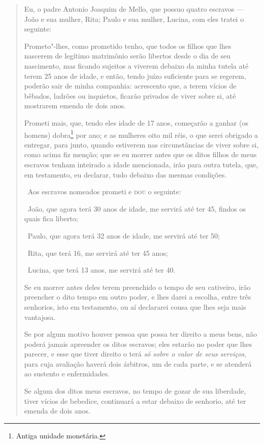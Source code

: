 \begin{quote}
Eu, o padre Antonio Joaquim de Mello, que possuo quatro escravos ---
João e sua mulher, Rita; Paulo e sua mulher, Lucina, com eles tratei o
seguinte:

Prometo"-lhes, como prometido tenho, que todos os filhos que lhes
nascerem de legítimo matrimônio serão libertos desde o dia de seu
nascimento, mas ficando sujeitos a viverem debaixo da minha tutela até
terem 25 anos de idade, e então, tendo juízo suficiente para se regerem,
poderão sair de minha companhia: acrescento que, a terem vícios de
bêbados, ladrões ou inquietos, ficarão privados de viver sobre si, até
mostrarem emenda de dois anos.

Prometi mais, que, tendo eles idade de 17 anos, começarão a ganhar (os
homens) dobra\footnote{Antiga unidade monetária.} por ano; e as
mulheres oito mil réis, o que serei obrigado a entregar, para junto,
quando estiverem nas circunstâncias de viver sobre si, como acima fiz
menção; que se eu morrer antes que os ditos filhos de meus escravos
tenham inteirado a idade mencionada, irão para outra tutela, que, em
testamento, eu declarar, tudo debaixo das mesmas condições.

\noindent\ Aos escravos nomeados prometi e \textsc{dou} o seguinte:

\noindent\ João, que agora terá 30 anos de idade, me servirá até ter 45, findos os
quais fica liberto;

\noindent\ Paulo, que agora terá 32 anos de idade, me servirá até ter 50;

\noindent\ Rita, que terá 16, me servirá até ter 45 anos;

\noindent\ Lucina, que terá 13 anos, me servirá até ter 40.

Se eu morrer antes deles terem preenchido o tempo de seu cativeiro, irão
preencher o dito tempo em outro poder, e lhes darei a escolha, entre
três senhorios, isto em testamento, ou aí declararei cousa que lhes seja
mais vantajosa.

Se por algum motivo houver pessoa que possa ter direito a meus bens, não
poderá jamais apreender os ditos escravos; eles estarão no poder que
lhes parecer, e esse que tiver direito o terá \emph{só sobre o valor de
seus serviços}, para cuja avaliação haverá dois árbitros, um de cada
parte, e se atenderá ao sustento e enfermidades.

Se algum dos ditos meus escravos, no tempo de gozar de sua liberdade,
tiver vícios de bebedice, continuará a estar debaixo de senhorio, até
ter emenda de dois anos.


\end{quote}
